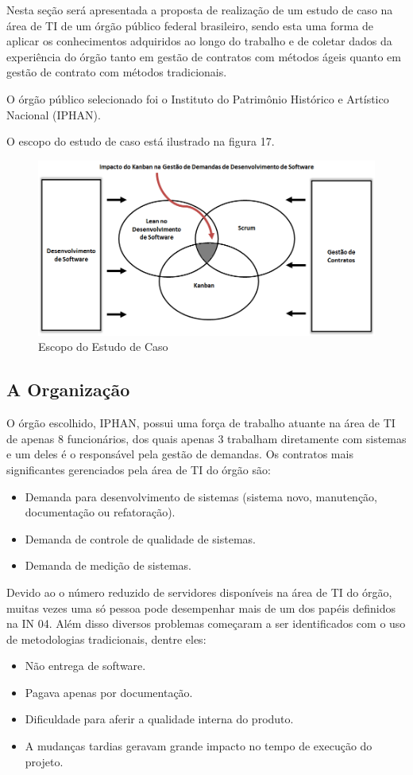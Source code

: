 Nesta seção será apresentada a proposta de realização de um estudo de caso na área de TI de um órgão público federal brasileiro, sendo esta uma forma de aplicar os conhecimentos adquiridos ao longo do trabalho e de coletar dados da experiência do órgão tanto em gestão de contratos com métodos ágeis quanto em gestão de contrato com métodos tradicionais.

O órgão público selecionado foi o Instituto do Patrimônio Histórico e Artístico Nacional (IPHAN).

O escopo do estudo de caso está ilustrado na figura 17. 
\begin{figure}[H]
		\centering
		\label{fig01}
			\includegraphics[scale=0.6]{figuras/escopoEC.png}
		\caption{Escopo do Estudo de Caso}
\end{figure}

\subsection[A Organização]{A Organização}

O órgão escolhido, IPHAN, possui uma força de trabalho atuante na área de TI de apenas 8 funcionários, dos quais apenas 3 trabalham diretamente com sistemas e um deles é o responsável pela gestão de demandas. Os contratos mais significantes gerenciados pela área de TI do órgão são:
\begin{itemize}
\item Demanda para desenvolvimento de sistemas (sistema novo, manutenção, documentação ou refatoração).
\item Demanda de controle de qualidade de sistemas.
\item Demanda de medição de sistemas.
\end{itemize}

Devido ao o número reduzido de servidores disponíveis na área de TI do órgão, muitas vezes uma só pessoa pode desempenhar mais de um dos papéis definidos na IN 04. Além disso diversos problemas começaram a ser identificados com o uso de metodologias tradicionais, dentre eles:
\begin{itemize}
\item Não entrega de software.
\item Pagava apenas por documentação.
\item Dificuldade para aferir a qualidade interna do produto.
\item A mudanças tardias geravam grande impacto no tempo de execução do projeto.
\end{itemize}

